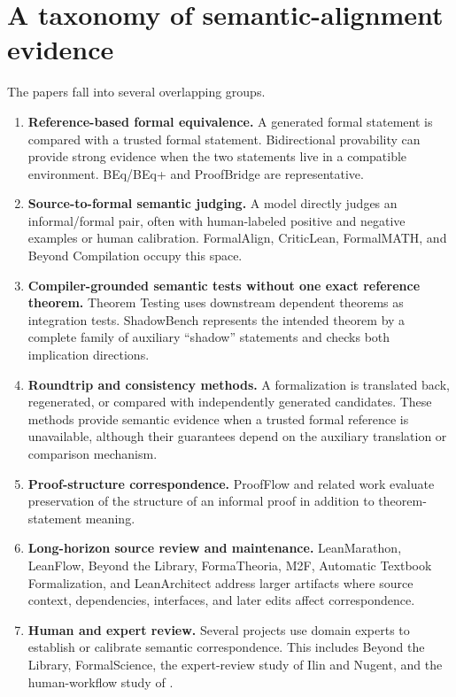 \documentclass[11pt]{article}
\begin{document}
\section{A taxonomy of semantic-alignment evidence}

The papers fall into several overlapping groups.

\begin{enumerate}
  \item \textbf{Reference-based formal equivalence.} A generated formal
  statement is compared with a trusted formal statement.  Bidirectional
  provability can provide strong evidence when the two statements live in a
  compatible environment.  BEq/BEq+ and ProofBridge are representative.

  \item \textbf{Source-to-formal semantic judging.} A model directly judges an
  informal/formal pair, often with human-labeled positive and negative examples
  or human calibration.  FormalAlign, CriticLean, FormalMATH, and Beyond
  Compilation occupy this space.

  \item \textbf{Compiler-grounded semantic tests without one exact reference
  theorem.}  Theorem Testing uses downstream dependent theorems as integration
  tests.  ShadowBench represents the intended theorem by a complete family of
  auxiliary ``shadow'' statements and checks both implication directions.

  \item \textbf{Roundtrip and consistency methods.}  A formalization is
  translated back, regenerated, or compared with independently generated
  candidates.  These methods provide semantic evidence when a trusted formal
  reference is unavailable, although their guarantees depend on the auxiliary
  translation or comparison mechanism.

  \item \textbf{Proof-structure correspondence.}  ProofFlow and related work
  evaluate preservation of the structure of an informal proof in addition to
  theorem-statement meaning.

  \item \textbf{Long-horizon source review and maintenance.}  LeanMarathon,
  LeanFlow, Beyond the Library, FormaTheoria, M2F, Automatic Textbook
  Formalization, and LeanArchitect address larger artifacts where source
  context, dependencies, interfaces, and later edits affect correspondence.

  \item \textbf{Human and expert review.}  Several projects use domain experts
  to establish or calibrate semantic correspondence.  This includes Beyond the
  Library, FormalScience, the expert-review study of Ilin and Nugent, and the
  human-workflow study of \citet{collins2026humanai}.
\end{enumerate}
\end{document}
